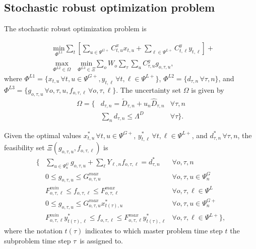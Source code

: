 \subsection{Stochastic robust optimization problem}

The stochastic robust optimization problem is

\begin{align}
&\label{saro_obj} \underset{\Phi^{L1}}{\text{min}} \sum\limits_{t} \left[ \sum\limits_{u \in \Psi^{G+}} C^x_{t, u} x_{t, u} + \sum\limits_{\ell \in \Psi^{L+}} C^y_{t, \ell} y_{t, \ell} \right] +  \\
&\underset{\Phi^{L2} \in \Omega}{\text{max}} \quad \underset{\Phi^{L3} \in \Xi}{\text{min}} \sum\limits_o W_o \sum\limits_{\tau} \sum\limits_{u} C^g_{\tau, u} g_{o, \tau, u},
\end{align}
where $\Phi^{L1} = \{ x_{t, u} \, \forall t, u \in  \Psi^{G+}, y_{t, \ell} \, \forall t, \ell \in  \Psi^{L+} \}$, $\Phi^{L2} = \{ d_{\tau, n} \, \forall \tau, n \}$, and $\Phi^{L3} = \{ g_{o, \tau, u} \, \forall o, \tau, u, f_{o, \tau, \ell} \, \forall o, \tau, \ell \}$. The uncertainty set $\Omega$ is given by
\begin{align}
\Omega = \{ &d_{\tau, n} = \tilde{D}_{\tau, n} + u_n \hat{D}_{\tau, n} & \forall \tau, n \nonumber \\
\label{uncertainty_set}&\sum\limits_n d_{\tau, n} \leq \Lambda^D & \forall \tau \}.
\end{align}

Given the optimal values $x_{t, u}^* \, \forall t, u \in \Psi^{G+}$, $y_{t, \ell}^* \, \forall t, \ell \in \Psi^{L+}$, and $d_{\tau, n}^* \, \forall \tau, n$, the feasibility set $\Xi(g_{o, \tau, u}, f_{o, \tau, \ell})$ is
\begin{align}
\{ &\sum\limits_{u \in \Psi^G_{n}} g_{o, \tau, u} + \sum\limits_{\ell} Y_{\ell, n} f_{o, \tau, \ell} = d_{\tau, n}^* & \forall o, \tau, n\\
&0 \leq g_{o, \tau, u} \leq G_{o, \tau, u}^{max} & \forall o, \tau, u \in \Psi_n^G\\
&F_{o, \tau, \ell}^{min} \leq f_{o, \tau, \ell} \leq F_{o, \tau, \ell}^{max} & \forall o, \tau, \ell \in \Psi^L \\
&0 \leq g_{o, \tau, u} \leq G_{o, \tau, u}^{max} x_{t(\tau), u}^* & \forall o, \tau, u \in \Psi_n^{G+} \\
&F_{o, \tau, \ell}^{min} y_{t(\tau), \ell}^* \leq f_{o, \tau, \ell} \leq F_{o, \tau, \ell}^{max} y_{t(\tau), \ell}^* & \forall o, \tau, \ell \in \Psi^{L+} \},
\end{align}
where the notation $t(\tau)$ indicates to which master problem time step $t$ the subproblem time step $\tau$ is assigned to.


